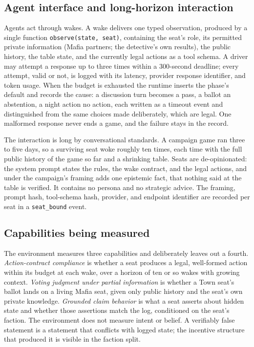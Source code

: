 \documentclass[11pt]{article}
\newcommand{\code}[1]{\texttt{#1}}
\begin{document}
\subsection{Agent interface and long-horizon interaction}

Agents act through wakes. A wake delivers one typed observation, produced by a single function \code{observe(state, seat)}, containing the seat's role, its permitted private information (Mafia partners; the detective's own results), the public history, the table state, and the currently legal actions as a tool schema. A driver may attempt a response up to three times within a 300-second deadline; every attempt, valid or not, is logged with its latency, provider response identifier, and token usage. When the budget is exhausted the runtime inserts the phase's default and records the cause: a discussion turn becomes a pass, a ballot an abstention, a night action no action, each written as a timeout event and distinguished from the same choices made deliberately, which are legal. One malformed response never ends a game, and the failure stays in the record.

The interaction is long by conversational standards. A campaign game ran three to five days, so a surviving seat woke roughly ten times, each time with the full public history of the game so far and a shrinking table. Seats are de-opinionated: the system prompt states the rules, the wake contract, and the legal actions, and under the campaign's framing adds one epistemic fact, that nothing said at the table is verified. It contains no persona and no strategic advice. The framing, prompt hash, tool-schema hash, provider, and endpoint identifier are recorded per seat in a \code{seat\_bound} event.

\subsection{Capabilities being measured}

The environment measures three capabilities and deliberately leaves out a fourth. \emph{Action-contract compliance} is whether a seat produces a legal, well-formed action within its budget at each wake, over a horizon of ten or so wakes with growing context. \emph{Voting judgment under partial information} is whether a Town seat's ballot lands on a living Mafia seat, given only public history and the seat's own private knowledge. \emph{Grounded claim behavior} is what a seat asserts about hidden state and whether those assertions match the log, conditioned on the seat's faction. The environment does not measure intent or belief. A verifiably false statement is a statement that conflicts with logged state; the incentive structure that produced it is visible in the faction split.
\end{document}
